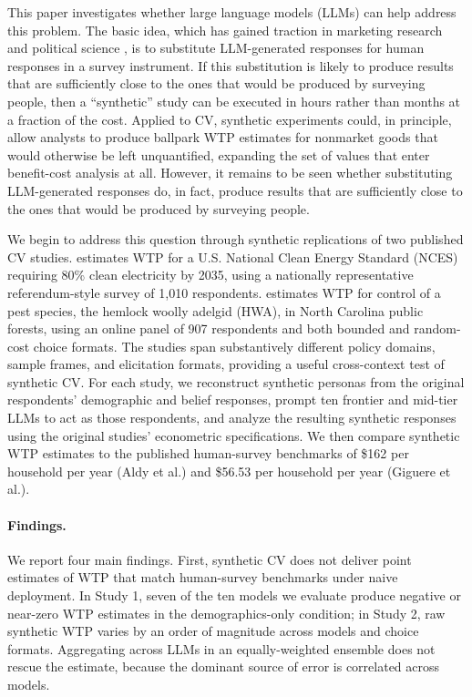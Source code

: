 \documentclass[12pt]{article}
\begin{document}
This paper investigates whether large language models (LLMs) can help address this problem. The basic idea, which has gained traction in marketing research \parencite{Brand2024, Li2024} and political science \parencite{Argyle2023, Bisbee2024}, is to substitute LLM-generated responses for human responses in a survey instrument. If this substitution is likely to produce results that are sufficiently close to the ones that would be produced by surveying people, then a ``synthetic'' study can be executed in hours rather than months at a fraction of the cost. Applied to CV, synthetic experiments could, in principle, allow analysts to produce ballpark WTP estimates for nonmarket goods that would otherwise be left unquantified, expanding the set of values that enter benefit-cost analysis at all. However, it remains to be seen whether substituting LLM-generated responses do, in fact, produce results that are sufficiently close to the ones that would be produced by surveying people.

We begin to address this question through synthetic replications of two published CV studies. \textcite{Aldy2012} estimates WTP for a U.S. National Clean Energy Standard (NCES) requiring 80\% clean electricity by 2035, using a nationally representative referendum-style survey of 1{,}010 respondents. \textcite{Giguere2020} estimates WTP for control of a pest species, the hemlock woolly adelgid (HWA), in North Carolina public forests, using an online panel of 907 respondents and both bounded and random-cost choice formats. The studies span substantively different policy domains, sample frames, and elicitation formats, providing a useful cross-context test of synthetic CV. For each study, we reconstruct synthetic personas from the original respondents' demographic and belief responses, prompt ten frontier and mid-tier LLMs to act as those respondents, and analyze the resulting synthetic responses using the original studies' econometric specifications. We then compare synthetic WTP estimates to the published human-survey benchmarks of \$162 per household per year (Aldy et al.) and \$56.53 per household per year (Giguere et al.).

\paragraph{Findings.} We report four main findings. First, synthetic CV does not deliver point estimates of WTP that match human-survey benchmarks under naive deployment. In Study 1, seven of the ten models we evaluate produce negative or near-zero WTP estimates in the demographics-only condition; in Study 2, raw synthetic WTP varies by an order of magnitude across models and choice formats. Aggregating across LLMs in an equally-weighted ensemble does not rescue the estimate, because the dominant source of error is correlated across models.
\end{document}
